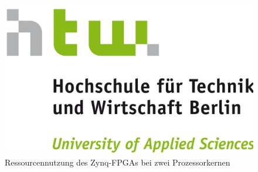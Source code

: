 \documentclass[11pt,a4paper,titlepage]{article}
\begin{document}
\begin{figure}[H]
\centering
\includegraphics[width=\textwidth]{images/htw_hochschule.png}
\caption{Ressourcennutzung des Zynq-FPGAs bei zwei Prozessorkernen}
\end{figure}
\end{document}
